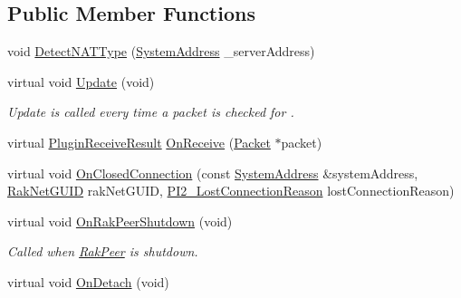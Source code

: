 \subsection*{Public Member Functions}
\begin{DoxyCompactItemize}
\item 
void \hyperlink{class_rak_net_1_1_nat_type_detection_client_a7b8e57d2e0d65bea6f58d41d15c188f1}{Detect\-N\-A\-T\-Type} (\hyperlink{struct_rak_net_1_1_system_address}{System\-Address} \-\_\-server\-Address)
\item 
\hypertarget{class_rak_net_1_1_nat_type_detection_client_a706c3f546daf15fa38abed920bb3fb4f}{virtual void \hyperlink{class_rak_net_1_1_nat_type_detection_client_a706c3f546daf15fa38abed920bb3fb4f}{Update} (void)}\label{class_rak_net_1_1_nat_type_detection_client_a706c3f546daf15fa38abed920bb3fb4f}

\begin{DoxyCompactList}\small\item\em Update is called every time a packet is checked for . \end{DoxyCompactList}\item 
virtual \hyperlink{group___p_l_u_g_i_n___i_n_t_e_r_f_a_c_e___g_r_o_u_p_ga89998adaafb29e5d879113b992161085}{Plugin\-Receive\-Result} \hyperlink{class_rak_net_1_1_nat_type_detection_client_a264c0f60ebec5f2332821abc5c774f1e}{On\-Receive} (\hyperlink{struct_rak_net_1_1_packet}{Packet} $\ast$packet)
\item 
virtual void \hyperlink{class_rak_net_1_1_nat_type_detection_client_a917181261834f08e30d65758bd07443d}{On\-Closed\-Connection} (const \hyperlink{struct_rak_net_1_1_system_address}{System\-Address} \&system\-Address, \hyperlink{struct_rak_net_1_1_rak_net_g_u_i_d}{Rak\-Net\-G\-U\-I\-D} rak\-Net\-G\-U\-I\-D, \hyperlink{group___p_l_u_g_i_n___i_n_t_e_r_f_a_c_e___g_r_o_u_p_ga376cc546fd6892c2ead48cd51796c8b8}{P\-I2\-\_\-\-Lost\-Connection\-Reason} lost\-Connection\-Reason)
\item 
\hypertarget{class_rak_net_1_1_nat_type_detection_client_a21c10bc12f361aa7460a3ecacbed45e9}{virtual void \hyperlink{class_rak_net_1_1_nat_type_detection_client_a21c10bc12f361aa7460a3ecacbed45e9}{On\-Rak\-Peer\-Shutdown} (void)}\label{class_rak_net_1_1_nat_type_detection_client_a21c10bc12f361aa7460a3ecacbed45e9}

\begin{DoxyCompactList}\small\item\em Called when \hyperlink{class_rak_net_1_1_rak_peer}{Rak\-Peer} is shutdown. \end{DoxyCompactList}\item 
\hypertarget{class_rak_net_1_1_nat_type_detection_client_a50373bab59f7d929df89c52834f86e27}{virtual void \hyperlink{class_rak_net_1_1_nat_type_detection_client_a50373bab59f7d929df89c52834f86e27}{On\-Detach} (void)}\label{class_rak_net_1_1_nat_type_detection_client_a50373bab59f7d929df89c52834f86e27}


\end{DoxyCompactItemize}
